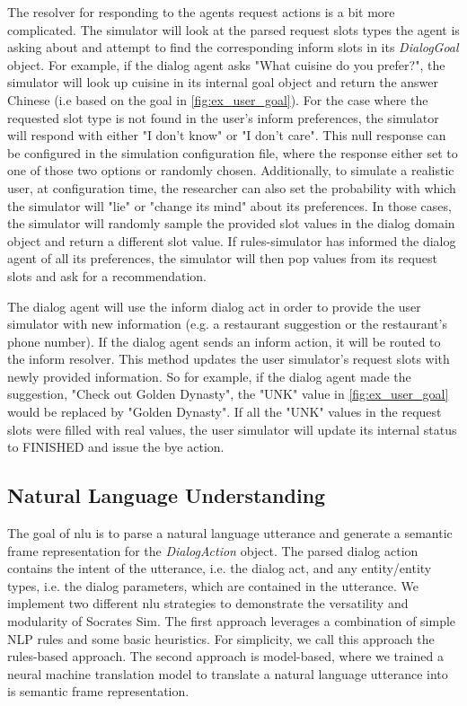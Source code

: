 The resolver for responding to the agents request actions is a bit more complicated. The simulator will look at the parsed request slots types the agent is asking about and attempt to find the corresponding inform slots in its \textit{DialogGoal} object. For example, if the dialog agent asks "What cuisine do you prefer?", the simulator will look up cuisine in its internal goal object and return the answer Chinese (i.e based on the goal in \ref{fig:ex_user_goal}). For the case where the requested slot type is not found in the user's inform preferences, the simulator will respond with either "I don't know" or "I don't care". This null response can be configured in the simulation configuration file, where the response either set to one of those two options or randomly chosen. Additionally, to simulate a realistic user, at configuration time, the researcher can also set the probability with which the simulator will "lie" or "change its mind" about its preferences. In those cases, the simulator will randomly sample the provided slot values in the dialog domain object and return a different slot value. If rules-simulator has informed the dialog agent of all its preferences, the simulator will then pop values from its request slots and ask for a recommendation. 

The dialog agent will use the inform dialog act in order to provide the user simulator with new information (e.g. a restaurant suggestion or the restaurant's phone number). If the dialog agent sends an inform action, it will be routed to the inform resolver. This method updates the user simulator's request slots with newly provided information. So for example, if the dialog agent made the suggestion, "Check out Golden Dynasty", the "UNK" value in \ref{fig:ex_user_goal} would be replaced by "Golden Dynasty". If all the "UNK" values in the request slots were filled with real values, the user simulator will update its internal status to FINISHED and issue the bye action. 

\subsection{Natural Language Understanding}
The goal of nlu is to parse a natural language utterance and generate a semantic frame representation for the \textit{DialogAction} object. The parsed dialog action contains the intent of the utterance, i.e. the dialog act, and any entity/entity types, i.e. the dialog parameters, which are contained in the utterance. We implement two different nlu strategies to demonstrate the versatility and modularity of Socrates Sim. The first approach leverages a combination of simple NLP rules and some basic heuristics. For simplicity, we call this approach the rules-based approach. The second approach is model-based, where we trained a neural machine translation model to translate a natural language utterance into is semantic frame representation. 

